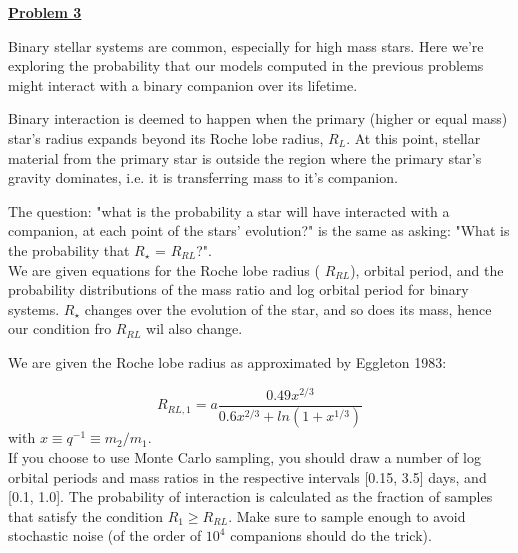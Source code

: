 \documentclass[11pt]{article}
\renewcommand{\section}[1]{\textbf{\underline{#1}}}
\begin{document}
\newpage
\vspace{0.1in}
\section{Problem 3}
\vspace{0.1in}

Binary stellar systems are common, especially for high mass stars. Here we're exploring the probability that our models computed in the previous problems might interact with a binary companion over its lifetime. 

Binary interaction is deemed to happen when the primary (higher or equal mass) star's radius expands beyond its Roche lobe radius, $R_L$. At this point, stellar material from the primary star is outside the region where the primary star's gravity dominates, i.e. it is transferring mass to it's companion. 

The question: "what is the probability a star will have interacted with a companion, at each point of the stars' evolution?" is the same as asking: "What is the probability that $R_{\star}$ = $R_{RL}$?". \\

We are given equations for the Roche lobe radius ( $R_{RL}$), orbital period, and the probability distributions of the mass ratio and log orbital period for binary systems. $R_{\star}$ changes over the evolution of the star, and so does its mass, hence our condition fro $R_{RL}$ wil also change.

We are given the Roche lobe radius as approximated by Eggleton 1983:

\begin{equation}
R_{RL,1} = a \frac{0.49 x^{2/3}}{0.6 x^{2/3} + ln(1 + x^{1/3})}
\end{equation}
with $x \equiv q^{-1} \equiv m_2/m_1$.\\

If you choose to use Monte Carlo sampling,  you should draw a number of log orbital periods and mass ratios in the respective intervals [0.15, 3.5] days, and [0.1, 1.0]. The probability of interaction is calculated as the fraction of samples that satisfy the condition $R_1 \geq R_{RL}$. Make sure to sample enough to avoid stochastic noise (of the order of $10^4$ companions should do the trick).\\
\end{document}
